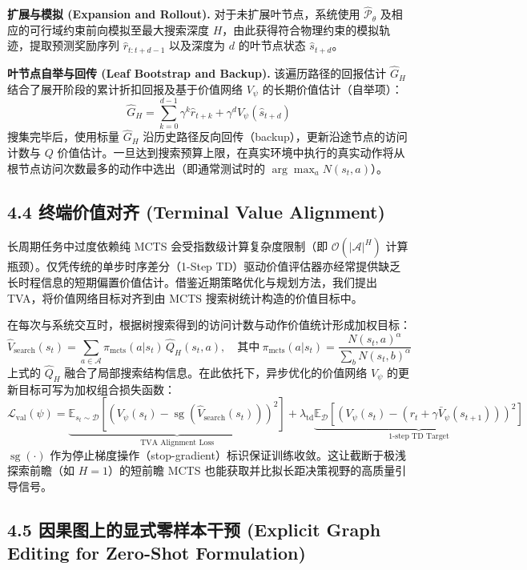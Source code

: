\documentclass[UTF8]{ctexart}
\begin{document}
\textbf{扩展与模拟 (Expansion and Rollout).}
对于未扩展叶节点，系统使用 $\hat{\mathcal P}_\theta$ 及相应的可行域约束前向模拟至最大搜索深度 $H$，由此获得符合物理约束的模拟轨迹，提取预测奖励序列 $\hat{r}_{t:t+d-1}$ 以及深度为 $d$ 的叶节点状态 $\hat{s}_{t+d}$。

\textbf{叶节点自举与回传 (Leaf Bootstrap and Backup).}
该遍历路径的回报估计 $\hat{G}_H$ 结合了展开阶段的累计折扣回报及基于价值网络 $V_\psi$ 的长期价值估计（自举项）：
\[
\hat G_H = \sum_{k=0}^{d-1}\gamma^k \hat r_{t+k} +\gamma^d V_\psi(\hat s_{t+d})
\]
搜集完毕后，使用标量 $\hat{G}_H$ 沿历史路径反向回传（backup），更新沿途节点的访问计数与 $Q$ 价值估计。一旦达到搜索预算上限，在真实环境中执行的真实动作将从根节点访问次数最多的动作中选出（即通常测试时的 $\arg\max_a N(s_t,a)$）。

\hypertarget{sub-tva}{%
\subsection{4.4 终端价值对齐 (Terminal Value Alignment)}\label{sub-tva}}

长周期任务中过度依赖纯 MCTS 会受指数级计算复杂度限制（即 $\mathcal{O}(|\mathcal{A}|^H)$ 计算瓶颈）。仅凭传统的单步时序差分（1-Step TD）驱动价值评估器亦经常提供缺乏长时程信息的短期偏置价值估计。借鉴近期策略优化与规划方法，我们提出 TVA，将价值网络目标对齐到由 MCTS 搜索树统计构造的价值目标中。

在每次与系统交互时，根据树搜索得到的访问计数与动作价值统计形成加权目标：
\[
\hat V_{\text{search}}(s_t)= \sum_{a \in \mathcal{A}} \pi_{\text{mcts}}(a|s_t)\,\hat Q_H(s_t,a),
\quad \text{其中}\ \pi_{\text{mcts}}(a|s_t)=\frac{N(s_t,a)^\alpha}{\sum_b N(s_t,b)^\alpha}
\]
上式的 $\hat Q_H$ 融合了局部搜索结构信息。在此依托下，异步优化的价值网络 $V_\psi$ 的更新目标可写为加权组合损失函数：
\[
\mathcal L_{\text{val}}(\psi)= \underbrace{ \mathbb E_{s_t\sim\mathcal D} \left[ \left( V_\psi(s_t)-\operatorname{sg}\!\left(\hat V_{\text{search}}(s_t)\right) \right)^2 \right]}_{\text{TVA Alignment Loss}} + \lambda_{\text{td}} \underbrace{ \mathbb E_{\mathcal D} \left[ \left( V_\psi(s_t)-\left(r_t+\gamma \bar V_\psi(s_{t+1})\right) \right)^2 \right]}_{\text{1-step TD Target}}
\]
$\operatorname{sg}(\cdot)$ 作为停止梯度操作（stop-gradient）标识保证训练收敛。这让截断于极浅探索前瞻（如 $H=1$）的短前瞻 MCTS 也能获取并比拟长距决策视野的高质量引导信号。

\hypertarget{sub-zero-shot}{%
\subsection{4.5 因果图上的显式零样本干预 (Explicit Graph Editing for Zero-Shot Formulation)}\label{sub-zero-shot}}
\end{document}
